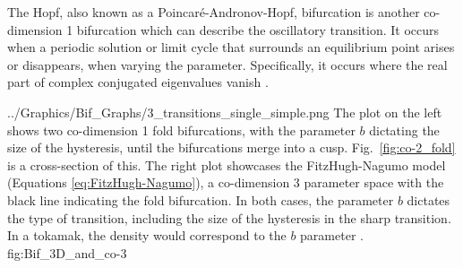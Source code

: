The Hopf, also known as a Poincar\'e-Andronov-Hopf, bifurcation is another co-dimension 1 bifurcation which can describe the oscillatory transition.
It occurs when a periodic solution or limit cycle that surrounds an equilibrium point arises or disappears, when varying the parameter.
Specifically, it occurs where the real part of complex conjugated eigenvalues vanish \cite{munoz-alicea_introduction_2011}.

	{../Graphics/Bif_Graphs/3_transitions_single_simple.png}
	{The plot on the left shows two co-dimension 1 fold bifurcations, with the parameter $b$ dictating the size of the hysteresis, until the bifurcations merge into a cusp.
	Fig.~\ref{fig:co-2_fold} is a cross-section of this.
	The right plot showcases the FitzHugh-Nagumo model (Equations \ref{eq:FitzHugh-Nagumo}), a co-dimension 3 parameter space with the black line indicating the fold bifurcation.
	In both cases, the parameter $b$ dictates the type of transition, including the size of the hysteresis in the sharp transition.
In a tokamak, the density would correspond to the $b$ parameter \cite{weymiens_bifurcation_2014}.}
	{fig:Bif_3D_and_co-3}

